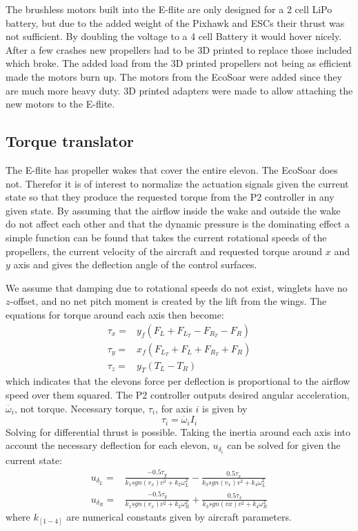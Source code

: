 \documentclass{article}
\begin{document}
The brushless motors built into the E-flite are only designed for a 2 cell LiPo battery, but due to the added weight of the Pixhawk and ESCs their thrust was not sufficient.
By doubling the voltage to a 4 cell Battery it would hover nicely.
After a few crashes new propellers had to be 3D printed to replace those included which broke.
The added load from the 3D printed propellers not being as efficient made the motors burn up.
The motors from the EcoSoar were added since they are much more heavy duty.
3D printed adapters were made to allow attaching the new motors to the E-flite.


\subsection{Torque translator}
The E-flite has propeller wakes that cover the entire elevon.
The EcoSoar does not.
Therefor it is of interest to normalize the actuation signals given the current state so that they produce the requested torque from the P2 controller in any given state.
By assuming that the airflow inside the wake and outside the wake do not affect each other and that the dynamic pressure is the dominating effect a simple function can be found that takes the current rotational speeds of the propellers, the current velocity of the aircraft and requested torque around $x$ and $y$ axis and gives the deflection angle of the control surfaces.

We assume that damping due to rotational speeds do not exist, winglets have no $z$-offset, and no net pitch moment is created by the lift from the wings.
The equations for torque around each axis then become:
\begin{equation}
\begin{split}
    \tau_x =& y_f ( F_L + F_{L_T} - F_{R_T} -F_R) \\
    \tau_y =& x_f ( F_{L_T} + F_L + F_{R_T} + F_R) \\
    \tau_z =& y_T ( T_L - T_R)
\end{split}
\end{equation}
which indicates that the elevons force per deflection is proportional to the airflow speed over them squared.
The P2 controller outputs desired angular acceleration, $\dot{\omega_i}$, not torque.
Necessary torque, $\tau_i$, for axis $i$ is given by
\begin{equation}
    \tau_i = \dot{\omega_i} I_i
\end{equation}
Solving for differential thrust is possible.
Taking the inertia around each axis into account the necessary deflection for each elevon, $u_{\delta_i}$ can be solved for given the current state:
\begin{equation}
\begin{split}
    u_{\delta_L} =& \frac{-0.5 \tau_y}{k_1 sgn(v_x) v^2 + k_2 \omega_L^2} - \frac{0.5 \tau_x}{k_3 sgn(v_x) v^2 + k_4\omega_L^2} \\
    u_{\delta_R} =& \frac{-0.5 \tau_y}{k_1 sgn(v_x) v^2 + k_2 \omega_R^2} + \frac{0.5 \tau_x}{k_3 sgn(vx) v^2 + k_4 \omega_R^2} 
\end{split}
\end{equation}
where $k_{[1-4]}$ are numerical constants given by aircraft parameters.
\end{document}
